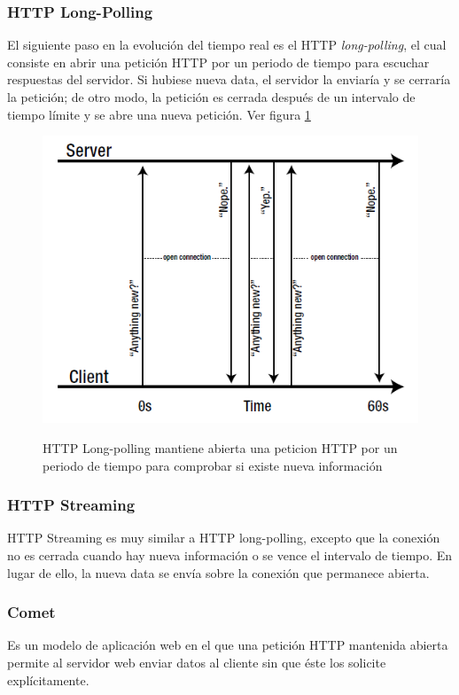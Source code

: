 \subsubsection{HTTP Long-Polling}
El siguiente paso en la evolución del tiempo real es el HTTP \emph{long-polling}, el cual consiste en abrir una petición HTTP por un periodo de tiempo para escuchar respuestas del servidor. Si hubiese nueva data, el servidor la enviaría y se cerraría la petición; de otro modo, la petición es cerrada después de un intervalo de tiempo límite y se abre una nueva petición. Ver figura \ref{fig:http_long_polling}
\begin{figure}[h]
  \centering
  \includegraphics[scale=0.8]{figuras/http_long_polling.png}\\
  \caption{HTTP Long-polling mantiene abierta una peticion HTTP por un periodo de tiempo para comprobar si existe nueva información}\label{fig:http_long_polling}
\end{figure}

\subsubsection{HTTP Streaming}
HTTP Streaming es muy similar a HTTP long-polling, excepto que la conexión no es cerrada cuando hay nueva información o se vence el intervalo de tiempo. En lugar de ello, la nueva data se envía sobre la conexión que permanece abierta.

\subsubsection{Comet}
Es un modelo de aplicación web en el que una petición HTTP mantenida abierta permite al servidor web enviar datos al cliente sin que éste los solicite explícitamente. 

